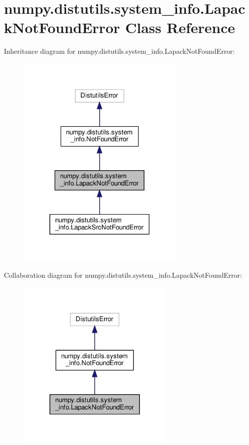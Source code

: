 \hypertarget{classnumpy_1_1distutils_1_1system__info_1_1LapackNotFoundError}{}\section{numpy.\+distutils.\+system\+\_\+info.\+Lapack\+Not\+Found\+Error Class Reference}
\label{classnumpy_1_1distutils_1_1system__info_1_1LapackNotFoundError}


Inheritance diagram for numpy.\+distutils.\+system\+\_\+info.\+Lapack\+Not\+Found\+Error\+:
\nopagebreak
\begin{figure}[H]
\begin{center}
\leavevmode
\includegraphics[width=231pt]{classnumpy_1_1distutils_1_1system__info_1_1LapackNotFoundError__inherit__graph}
\end{center}
\end{figure}


Collaboration diagram for numpy.\+distutils.\+system\+\_\+info.\+Lapack\+Not\+Found\+Error\+:
\nopagebreak
\begin{figure}[H]
\begin{center}
\leavevmode
\includegraphics[width=216pt]{classnumpy_1_1distutils_1_1system__info_1_1LapackNotFoundError__coll__graph}
\end{center}
\end{figure}


